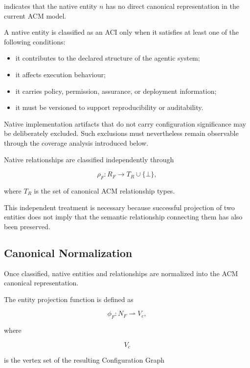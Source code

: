 \documentclass[10pt]{article}
\begin{document}
indicates that the native entity $n$ has no direct canonical representation in
the current ACM model.

A native entity is classified as an ACI only when it satisfies at least one of
the following conditions:

\begin{itemize}
	\item it contributes to the declared structure of the agentic system;
	\item it affects execution behaviour;
	\item it carries policy, permission, assurance, or deployment information;
	\item it must be versioned to support reproducibility or auditability.
\end{itemize}

Native implementation artifacts that do not carry configuration significance
may be deliberately excluded. Such exclusions must nevertheless remain
observable through the coverage analysis introduced below.

Native relationships are classified independently through

\begin{equation}
\rho_F :
R_F
\rightarrow
T_R
\cup
\{\bot\},
\end{equation}

where $T_R$ is the set of canonical ACM relationship types.

This independent treatment is necessary because successful projection of two
entities does not imply that the semantic relationship connecting them has also
been preserved.

\subsection{Canonical Normalization}

Once classified, native entities and relationships are normalized into the ACM
canonical representation.

The entity projection function is defined as

\begin{equation}
\phi_F :
N_F
\rightharpoonup
V_c,
\end{equation}

where

\[
V_c
\]

is the vertex set of the resulting Configuration Graph
\end{document}
